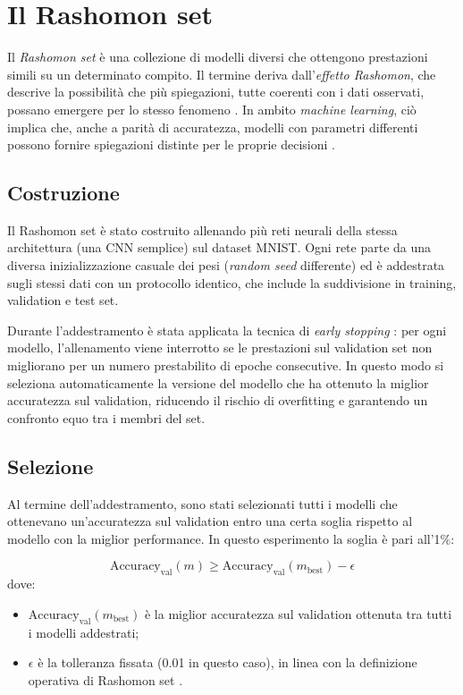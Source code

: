 \documentclass[12pt,a4paper,oneside]{report}
\numberwithin{figure}{chapter}
\numberwithin{table}{chapter}
\begin{document}
\chapter{Il Rashomon set}

Il \emph{Rashomon set} è una collezione di modelli diversi che ottengono
prestazioni simili su un determinato compito. Il termine deriva
dall’\emph{effetto Rashomon}, che descrive la possibilità che più spiegazioni,
tutte coerenti con i dati osservati, possano emergere per lo stesso fenomeno
\citep{mueller2023rashomon}. In ambito \emph{machine learning}, ciò implica
che, anche a parità di accuratezza, modelli con parametri differenti possono
fornire spiegazioni distinte per le proprie decisioni
\citep{fisher2019all,semenova2019existence}.

\section{Costruzione}
Il Rashomon set è stato costruito allenando più reti neurali della stessa
architettura (una CNN semplice) sul dataset MNIST. Ogni rete parte da una
diversa inizializzazione casuale dei pesi (\emph{random seed} differente) ed è
addestrata sugli stessi dati con un protocollo identico, che include la
suddivisione in training, validation e test set.

Durante l’addestramento è stata applicata la tecnica di \emph{early stopping}
\citep{prechelt1998early}: per ogni modello, l’allenamento viene interrotto se
le prestazioni sul validation set non migliorano per un numero prestabilito di
epoche consecutive. In questo modo si seleziona automaticamente la versione del
modello che ha ottenuto la miglior accuratezza sul validation, riducendo il
rischio di overfitting e garantendo un confronto equo tra i membri del set.

\section{Selezione}
Al termine dell’addestramento, sono stati selezionati tutti i modelli che
ottenevano un’accuratezza sul validation entro una certa soglia rispetto al
modello con la miglior performance. In questo esperimento la soglia è pari
all’1\%:

\[
      \mathrm{Accuracy}_{\mathrm{val}}(m) \geq \mathrm{Accuracy}_{\mathrm{val}}(m_{\mathrm{best}}) - \epsilon
\]
dove:
\begin{itemize}
      \item $\mathrm{Accuracy}_{\mathrm{val}}(m_{\mathrm{best}})$ è la miglior accuratezza sul validation ottenuta tra tutti i modelli addestrati;
      \item $\epsilon$ è la tolleranza fissata (0.01 in questo caso), in linea con la definizione operativa di Rashomon set \citep{fisher2019all}.
\end{itemize}
\end{document}
